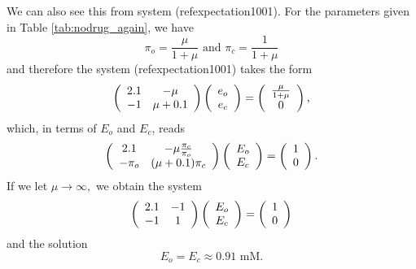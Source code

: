 {We can also see this from system (ref{expectation1001}). For the parameters given
in Table \ref{tab:nodrug_again}, we have
\[ \pi_{o}=\frac{\mu}{1+\mu}  \text{ and }  \pi_{c}=\frac{1}{1+\mu}\]
and therefore the 
system (ref{expectation1001}) takes the form
\begin{equation}
\left(
\begin{array}
[c]{cc}
2.1 & -\mu\\
-1 & \mu+0.1
\end{array}
\right)  \left(
\begin{array}
[c]{c}
e_{o}\\
e_{c}
\end{array}
\right)  =\left(
\begin{array}
[c]{c}
\frac{\mu}{1+\mu}\\
0
\end{array}
\right)  ,
\end{equation}
which, in terms of $E_{o}$ and $E_{c}$, reads
\begin{equation}
\left(
\begin{array}
[c]{cc}
2.1 & -\mu \frac{\pi_c}{\pi_o}\\
-\pi_o & (\mu+0.1)\pi_c
\end{array}
\right)  \left(
\begin{array}
[c]{c}
E_{o}\\
E_{c}
\end{array}
\right)  =\left(
\begin{array}
[c]{c}
1\\
0
\end{array}
\right)  .
\end{equation}
If we let $\mu\longrightarrow\infty,$ we obtain the system
\begin{equation}
\left(
\begin{array}
[c]{cc}
2.1 & -1\\
-1 & 1
\end{array}
\right)  \left(
\begin{array}
[c]{c}
E_{o}\\
E_{c}
\end{array}
\right)  =\left(
\begin{array}
[c]{c}
1\\
0
\end{array}
\right)  
\end{equation}
and the solution
\[
E_{o}=E_{c}\approx 0.91 \text{ mM}.
\]

}
